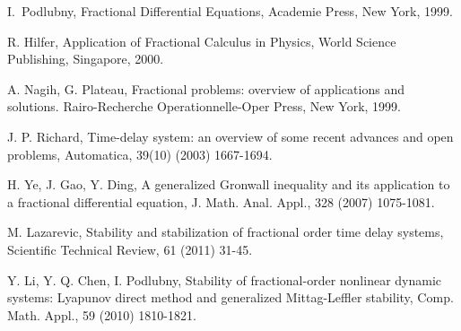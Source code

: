 \begin{thebibliography}{9}

 I.~Podlubny, Fractional Differential Equations, Academie Press, New York, 1999.

 R. Hilfer, Application of Fractional Calculus in Physics, World Science Publishing, Singapore, 2000.

 A. Nagih, G. Plateau, Fractional problems: overview of applications and solutions. Rairo-Recherche Operationnelle-Oper Press, New York, 1999.

 J. P. Richard, Time-delay system: an overview of some recent advances and open problems, Automatica, 39(10) (2003) 1667-1694.

 H. Ye, J. Gao, Y. Ding, A generalized Gronwall inequality and its application to a fractional differential equation, J. Math. Anal. Appl., 328 (2007) 1075-1081.

 M. Lazarevic, Stability and stabilization of fractional order time delay systems, Scientific Technical Review, 61 (2011) 31-45.

 Y. Li, Y. Q. Chen, I. Podlubny, Stability of fractional-order nonlinear dynamic systems: Lyapunov direct method and generalized Mittag-Leffler stability, Comp. Math. Appl., 59 (2010) 1810-1821.


\end{thebibliography}

